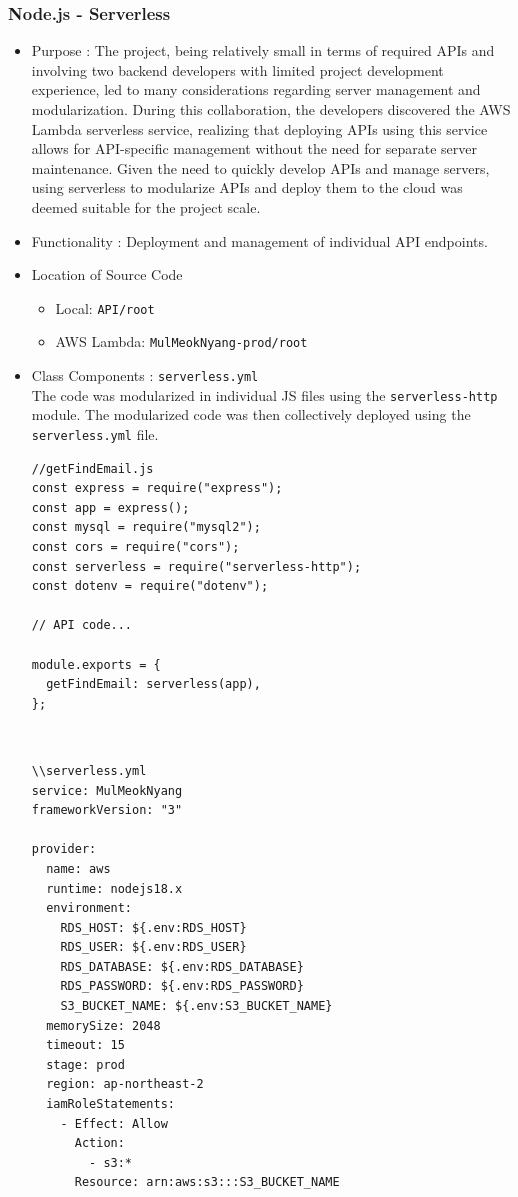 \documentclass[conference]{IEEEtran}
\begin{document}
\subsubsection{Node.js - Serverless}
    \begin{itemize}
        \item Purpose : The project, being relatively small in terms of required APIs and involving two backend developers with limited project development experience, led to many considerations regarding server management and modularization. During this collaboration, the developers discovered the AWS Lambda serverless service, realizing that deploying APIs using this service allows for API-specific management without the need for separate server maintenance. Given the need to quickly develop APIs and manage servers, using serverless to modularize APIs and deploy them to the cloud was deemed suitable for the project scale.
        \item Functionality : Deployment and management of individual API endpoints.
        \item Location of Source Code
        \begin{itemize}
            \item Local: \texttt{API/root}
            \item AWS Lambda: \texttt{MulMeokNyang-prod/root}
        \end{itemize}
        \item Class Components : \texttt{serverless.yml}\\The code was modularized in individual JS files using the \texttt{serverless-http} module. The modularized code was then collectively deployed using the \texttt{serverless.yml} file.
        \begin{lstlisting}[style=htmlcssjs]
//getFindEmail.js
const express = require("express");
const app = express();
const mysql = require("mysql2");
const cors = require("cors");
const serverless = require("serverless-http");
const dotenv = require("dotenv");

// API code...

module.exports = {
  getFindEmail: serverless(app),
};
\end{lstlisting}
\\

\begin{lstlisting}[style=htmlcssjs]
\\serverless.yml
service: MulMeokNyang
frameworkVersion: "3"

provider:
  name: aws
  runtime: nodejs18.x
  environment:
    RDS_HOST: ${.env:RDS_HOST}
    RDS_USER: ${.env:RDS_USER}
    RDS_DATABASE: ${.env:RDS_DATABASE}
    RDS_PASSWORD: ${.env:RDS_PASSWORD}
    S3_BUCKET_NAME: ${.env:S3_BUCKET_NAME}
  memorySize: 2048
  timeout: 15
  stage: prod
  region: ap-northeast-2
  iamRoleStatements:
    - Effect: Allow
      Action:
        - s3:*
      Resource: arn:aws:s3:::S3_BUCKET_NAME


\end{lstlisting}
\end{itemize}
\end{document}

